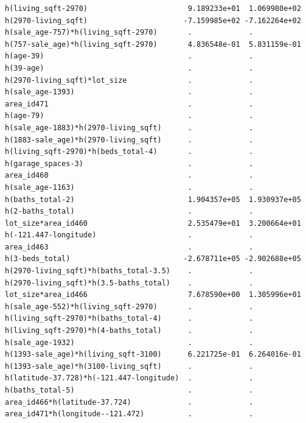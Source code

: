 \documentclass[
]{article}
\begin{document}
\begin{verbatim}
h(living_sqft-2970)                       9.189233e+01  1.069980e+02
h(2970-living_sqft)                      -7.159985e+02 -7.162264e+02
h(sale_age-757)*h(living_sqft-2970)       .             .           
h(757-sale_age)*h(living_sqft-2970)       4.836548e-01  5.831159e-01
h(age-39)                                 .             .           
h(39-age)                                 .             .           
h(2970-living_sqft)*lot_size              .             .           
h(sale_age-1393)                          .             .           
area_id471                                .             .           
h(age-79)                                 .             .           
h(sale_age-1883)*h(2970-living_sqft)      .             .           
h(1883-sale_age)*h(2970-living_sqft)      .             .           
h(living_sqft-2970)*h(beds_total-4)       .             .           
h(garage_spaces-3)                        .             .           
area_id460                                .             .           
h(sale_age-1163)                          .             .           
h(baths_total-2)                          1.904357e+05  1.930937e+05
h(2-baths_total)                          .             .           
lot_size*area_id460                       2.535479e+01  3.200664e+01
h(-121.447-longitude)                     .             .           
area_id463                                .             .           
h(3-beds_total)                          -2.678711e+05 -2.902688e+05
h(2970-living_sqft)*h(baths_total-3.5)    .             .           
h(2970-living_sqft)*h(3.5-baths_total)    .             .           
lot_size*area_id466                       7.678590e+00  1.305996e+01
h(sale_age-552)*h(living_sqft-2970)       .             .           
h(living_sqft-2970)*h(baths_total-4)      .             .           
h(living_sqft-2970)*h(4-baths_total)      .             .           
h(sale_age-1932)                          .             .           
h(1393-sale_age)*h(living_sqft-3100)      6.221725e-01  6.264016e-01
h(1393-sale_age)*h(3100-living_sqft)      .             .           
h(latitude-37.728)*h(-121.447-longitude)  .             .           
h(baths_total-5)                          .             .           
area_id466*h(latitude-37.724)             .             .           
area_id471*h(longitude--121.472)          .             .           
                                                                    

\end{verbatim}
\end{document}
